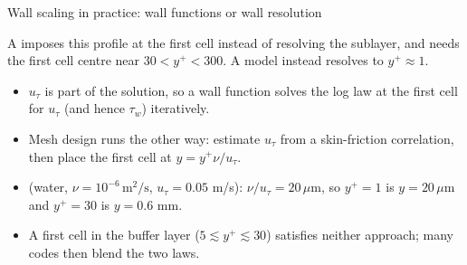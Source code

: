\documentclass[aspectratio=169,11pt]{beamer}
\newcommand{\Rey}{\mathrm{Re}}
\begin{document}
\begin{frame}{Wall scaling in practice: wall functions or wall resolution}
\begin{punchbox}
A  imposes this profile at the first cell instead of resolving the sublayer, and needs the first cell centre near $30<y^+<300$. A \hi{low-$\Rey$} model instead resolves to $y^+\approx1$.
\end{punchbox}

\begin{itemize}\itemsep4pt
  \item $u_\tau$ is part of the solution, so a wall function solves the log law at the first cell for $u_\tau$ (and hence $\tau_w$) iteratively.
  \item Mesh design runs the other way: estimate $u_\tau$ from a skin-friction correlation, then place the first cell at $y=y^+\nu/u_\tau$.
  \item {} (water, $\nu=10^{-6}\,\mathrm{m^2/s}$, $u_\tau=0.05$ m/s): $\nu/u_\tau=20\,\mu$m, so $y^+=1$ is $y=20\,\mu$m and $y^+=30$ is $y=0.6$ mm.
  \item A first cell in the buffer layer ($5\lesssim y^+\lesssim30$) satisfies neither approach; many codes then blend the two laws.
\end{itemize}
\end{frame}
\end{document}
